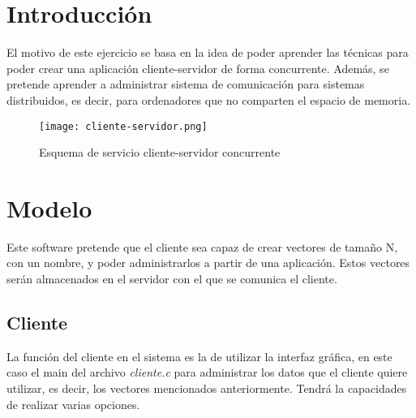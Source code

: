 \documentclass[10pt, spanish, pdftex]{template/UC3M_document}
\author{Alejandro Prieto Macías}         %
\begin{document}
\titleMain

\begin{spacing}{0.5}
    \hypersetup{linkcolor=black}    %
    \tableofcontents\newpage        %
\end{spacing}


\section{Introducción}\label{section_label}
El motivo de este ejercicio se basa en la idea de poder aprender las técnicas para poder crear una aplicación cliente-servidor de forma concurrente. Además, se pretende aprender a administrar sistema de comunicación para sistemas distribuidos, es decir, para ordenadores que no comparten el espacio de memoria.

  \vspace{2cm}
  \begin{figure}[h]
    \texttt{[image: cliente-servidor.png]}
    \caption{Esquema de servicio cliente-servidor concurrente}
    \centering
  \end{figure}


\newpage
\section{Modelo}
Este software pretende que el cliente sea capaz de crear vectores de tamaño N, con un nombre, y poder administrarlos a partir de una aplicación. Estos vectores serán almacenados en el servidor con el que se comunica el cliente.

\subsection{Cliente}
La función del cliente en el sistema es la de utilizar la interfaz gráfica, en este caso el main del archivo \textit{cliente.c} para administrar los datos que el cliente quiere utilizar, es decir, los vectores mencionados anteriormente. Tendrá la capacidades de realizar varias opciones.
\end{document}
